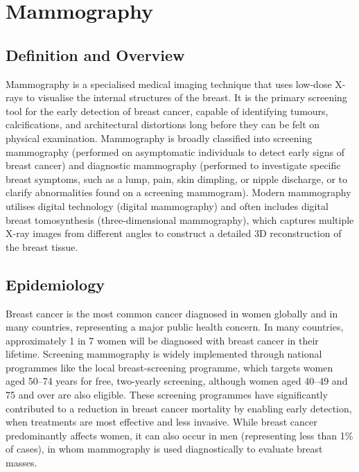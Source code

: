 \chapter{Mammography}

\section*{Definition and Overview}
Mammography is a specialised medical imaging technique that uses low-dose X-rays to visualise the internal structures of the breast. It is the primary screening tool for the early detection of breast cancer, capable of identifying tumours, calcifications, and architectural distortions long before they can be felt on physical examination. Mammography is broadly classified into screening mammography (performed on asymptomatic individuals to detect early signs of breast cancer) and diagnostic mammography (performed to investigate specific breast symptoms, such as a lump, pain, skin dimpling, or nipple discharge, or to clarify abnormalities found on a screening mammogram). Modern mammography utilises digital technology (digital mammography) and often includes digital breast tomosynthesis (three-dimensional mammography), which captures multiple X-ray images from different angles to construct a detailed 3D reconstruction of the breast tissue.

\section*{Epidemiology}
Breast cancer is the most common cancer diagnosed in women globally and in many countries, representing a major public health concern. In many countries, approximately 1 in 7 women will be diagnosed with breast cancer in their lifetime. Screening mammography is widely implemented through national programmes like the local breast-screening programme, which targets women aged 50--74 years for free, two-yearly screening, although women aged 40--49 and 75 and over are also eligible. These screening programmes have significantly contributed to a reduction in breast cancer mortality by enabling early detection, when treatments are most effective and less invasive. While breast cancer predominantly affects women, it can also occur in men (representing less than 1\% of cases), in whom mammography is used diagnostically to evaluate breast masses.

